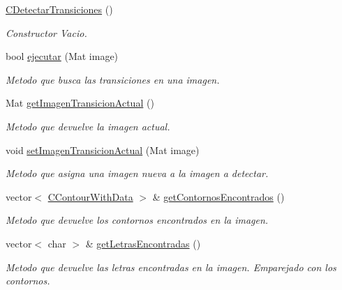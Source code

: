 \begin{DoxyCompactItemize}
\item 
\hyperlink{classCDetectarTransiciones_a99c333a4c8c5a4bb0e03ac09ab6e50b9}{C\+Detectar\+Transiciones} ()
\begin{DoxyCompactList}\small\item\em Constructor Vacio. \end{DoxyCompactList}\item 
bool \hyperlink{classCDetectarTransiciones_a19b374a5d7b5ddb01fada5b3a9d952d7}{ejecutar} (Mat image)
\begin{DoxyCompactList}\small\item\em Metodo que busca las transiciones en una imagen. \end{DoxyCompactList}\item 
Mat \hyperlink{classCDetectarTransiciones_aa9cea5befc08385a46baf86adc305737}{get\+Imagen\+Transicion\+Actual} ()
\begin{DoxyCompactList}\small\item\em Metodo que devuelve la imagen actual. \end{DoxyCompactList}\item 
void \hyperlink{classCDetectarTransiciones_a9f341c8df22490d46b266844b16f8585}{set\+Imagen\+Transicion\+Actual} (Mat image)
\begin{DoxyCompactList}\small\item\em Metodo que asigna una imagen nueva a la imagen a detectar. \end{DoxyCompactList}\item 
vector$<$ \hyperlink{classCContourWithData}{C\+Contour\+With\+Data} $>$ \& \hyperlink{classCDetectarTransiciones_a729c3aaffe2cc888e62c81a58814c1e9}{get\+Contornos\+Encontrados} ()
\begin{DoxyCompactList}\small\item\em Metodo que devuelve los contornos encontrados en la imagen. \end{DoxyCompactList}\item 
vector$<$ char $>$ \& \hyperlink{classCDetectarTransiciones_a1e7c9eac75874737cf7a2b7d7a4375c7}{get\+Letras\+Encontradas} ()
\begin{DoxyCompactList}\small\item\em Metodo que devuelve las letras encontradas en la imagen. Emparejado con los contornos. \end{DoxyCompactList}\end{DoxyCompactItemize}

